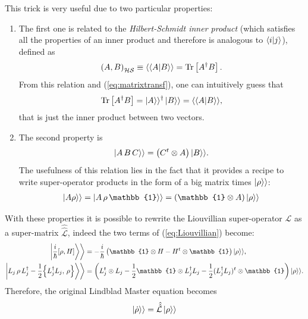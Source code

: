 This trick is very useful due to two particular properties:
\begin{enumerate}
    \item The first one is related to the \textit{Hilbert-Schmidt inner product} (which satisfies all the properties of an inner product and therefore is analogous to $\braket{i}{j}$), defined as
    \begin{align*}
        \left( A,B\right)_{\mathcal{HS}} \equiv \langle \braket{A}{B} \rangle = \text{Tr}\left[ A^\dagger B \right].
    \end{align*}
    From this relation and (\ref{eq:matrixtransf}), one can intuitively guess that 
    \begin{align}
         \text{Tr}\left[ A^\dagger B \right] = \ket{A}\rangle^\dagger \ket{B}\rangle =  \langle \braket{A}{B} \rangle, 
         \label{eq:traceVect}
    \end{align}
    that is just the inner product between two vectors. 
    \item The second property is 
    \begin{align}
        \ket{A\, B\, C}\rangle = \left( C^t \otimes A \right) \ket{B}\rangle.
    \end{align}
    The usefulness of this relation lies in the fact that it provides a recipe to write super-operator products in the form of a big matrix times $\ket{{\rho}}\rangle$:
    \begin{align*}
        \ket{A{\rho}}\rangle = \ket{A \, {\rho} \, \mathbb{1}}\rangle = (\mathbb{1} \otimes A) \ket{{\rho}}\rangle 
    \end{align*}
\end{enumerate}
With these properties it is possible to rewrite the Liouvillian super-operator $\mathcal{L}$ as a super-matrix $\hat{\hat{\mathcal{L}}}$, indeed the two terms of (\ref{eq:Liouvillian}) become:
\begin{align*}
    \ket{\frac{i}{\hbar} [\rho,H]}\biggr\rangle &= -\frac{i}{\hbar} \left( \mathbb{1} \otimes H - H^t \otimes \mathbb{1} \right) \ket{\rho}\rangle,\\
    \ket{ L_j \, \rho \,  L_j^\dagger - \frac{1}{2} \Bigl\{ L_j^\dagger L_j, \, \rho \Bigr\} } \biggr\rangle &= \left( L_j^t \otimes L_j - \frac{1}{2} \mathbb{1} \otimes L_j^\dagger L_j - \frac{1}{2} (L_j^\dagger L_j)^t \otimes \mathbb{1} \right) \ket{\rho}\rangle.
\end{align*}
Therefore, the original Lindblad Master equation becomes 
\begin{align}
    \ket{\dot{\rho}}\rangle = \hat{\hat{\mathcal{L}}} \ket{{\rho}}\rangle
    \label{eq:LindbladVect}
\end{align}
